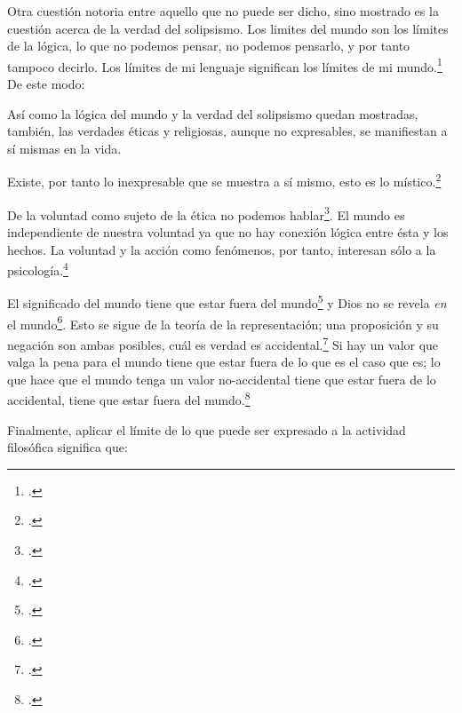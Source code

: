 Otra cuestión notoria entre aquello que no puede ser dicho, sino mostrado es la
cuestión acerca de la verdad del solipsismo. Los limites del mundo son los
límites de la lógica, lo que no podemos pensar, no podemos pensarlo, y por tanto
tampoco decirlo. Los límites de mi lenguaje significan los límites de mi
mundo.\footcite[cf~.][5.6~y~5.61]{tractatus} De este modo:

Así como la lógica del mundo y la verdad del solipsismo quedan mostradas,
también, las verdades éticas y religiosas, aunque no expresables, se manifiestan
a sí mismas en la vida. 

Existe, por tanto lo inexpresable que se muestra a sí mismo, esto es lo
místico.\footcite[cf.~][6.522]{tractatus}

De la voluntad como sujeto de la ética no podemos
hablar\footcite[cf.~][6.423]{tractatus}. El mundo es independiente de nuestra
voluntad ya que no hay conexión lógica entre ésta y los hechos.
La voluntad y la acción como fenómenos, por tanto, interesan sólo a la
psicología.\footcite[cf.~][p.171 \S3]{IWT}

El significado del mundo tiene que estar fuera del
mundo\footcite[cf.~][6.41]{tractatus} y Dios no se revela \emph{en} el
mundo\footcite[cf.~][6.432]{tractatus}. 
Esto se sigue de la teoría de la representación; una proposición y su negación
son ambas posibles, cuál es verdad es accidental.\footcite[cf.~][p.170 \S4]{IWT}
Si hay un valor que valga la pena para el mundo tiene que estar fuera de lo que
es el caso que es; lo que hace que el mundo tenga un valor no-accidental tiene
que estar fuera de lo accidental, tiene que estar fuera del
mundo.\footcite[cf.~][6.41]{tractatus} 

Finalmente, aplicar el límite de lo que puede ser expresado a la actividad
filosófica significa que:

